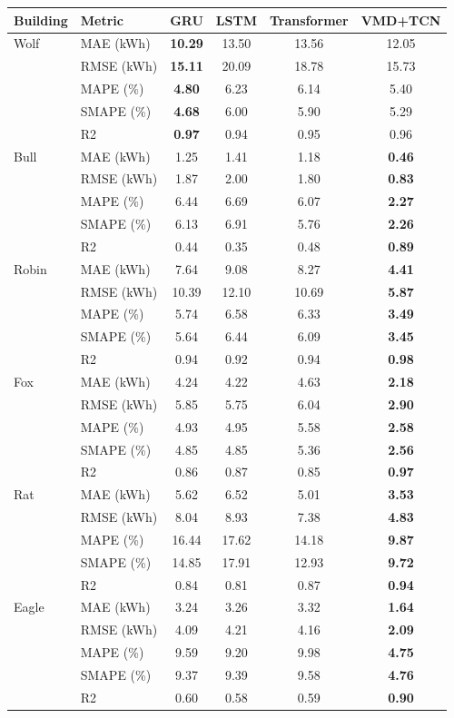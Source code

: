 \begin{tabular}{llcccc}
\toprule
Building & Metric & GRU & LSTM & Transformer & VMD+TCN \\
\midrule
Wolf & MAE (kWh) & \textbf{10.29} & 13.50 & 13.56 & 12.05 \\
 & RMSE (kWh) & \textbf{15.11} & 20.09 & 18.78 & 15.73 \\
 & MAPE (\%) & \textbf{4.80} & 6.23 & 6.14 & 5.40 \\
 & SMAPE (\%) & \textbf{4.68} & 6.00 & 5.90 & 5.29 \\
 & R2 & \textbf{0.97} & 0.94 & 0.95 & 0.96 \\
\midrule
Bull & MAE (kWh) & 1.25 & 1.41 & 1.18 & \textbf{0.46} \\
 & RMSE (kWh) & 1.87 & 2.00 & 1.80 & \textbf{0.83} \\
 & MAPE (\%) & 6.44 & 6.69 & 6.07 & \textbf{2.27} \\
 & SMAPE (\%) & 6.13 & 6.91 & 5.76 & \textbf{2.26} \\
 & R2 & 0.44 & 0.35 & 0.48 & \textbf{0.89} \\
\midrule
Robin & MAE (kWh) & 7.64 & 9.08 & 8.27 & \textbf{4.41} \\
 & RMSE (kWh) & 10.39 & 12.10 & 10.69 & \textbf{5.87} \\
 & MAPE (\%) & 5.74 & 6.58 & 6.33 & \textbf{3.49} \\
 & SMAPE (\%) & 5.64 & 6.44 & 6.09 & \textbf{3.45} \\
 & R2 & 0.94 & 0.92 & 0.94 & \textbf{0.98} \\
\midrule
Fox & MAE (kWh) & 4.24 & 4.22 & 4.63 & \textbf{2.18} \\
 & RMSE (kWh) & 5.85 & 5.75 & 6.04 & \textbf{2.90} \\
 & MAPE (\%) & 4.93 & 4.95 & 5.58 & \textbf{2.58} \\
 & SMAPE (\%) & 4.85 & 4.85 & 5.36 & \textbf{2.56} \\
 & R2 & 0.86 & 0.87 & 0.85 & \textbf{0.97} \\
\midrule
Rat & MAE (kWh) & 5.62 & 6.52 & 5.01 & \textbf{3.53} \\
 & RMSE (kWh) & 8.04 & 8.93 & 7.38 & \textbf{4.83} \\
 & MAPE (\%) & 16.44 & 17.62 & 14.18 & \textbf{9.87} \\
 & SMAPE (\%) & 14.85 & 17.91 & 12.93 & \textbf{9.72} \\
 & R2 & 0.84 & 0.81 & 0.87 & \textbf{0.94} \\
\midrule
Eagle & MAE (kWh) & 3.24 & 3.26 & 3.32 & \textbf{1.64} \\
 & RMSE (kWh) & 4.09 & 4.21 & 4.16 & \textbf{2.09} \\
 & MAPE (\%) & 9.59 & 9.20 & 9.98 & \textbf{4.75} \\
 & SMAPE (\%) & 9.37 & 9.39 & 9.58 & \textbf{4.76} \\
 & R2 & 0.60 & 0.58 & 0.59 & \textbf{0.90} \\
\bottomrule
\end{tabular}